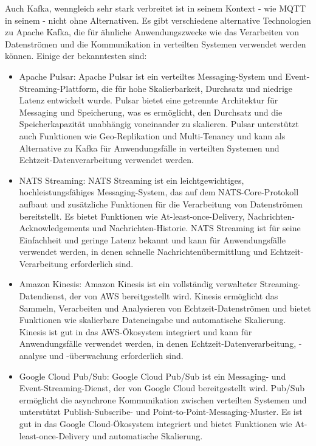 Auch Kafka, wenngleich sehr stark verbreitet ist in seinem Kontext - wie MQTT in seinem - nicht ohne Alternativen. Es gibt verschiedene alternative Technologien zu Apache Kafka, die für ähnliche Anwendungszwecke wie das Verarbeiten von Datenströmen und die Kommunikation in verteilten Systemen verwendet werden können. Einige der bekanntesten sind:
\begin{itemize}
\item Apache Pulsar: Apache Pulsar ist ein verteiltes Messaging-System und Event-Streaming-Plattform, die für hohe Skalierbarkeit, Durchsatz und niedrige Latenz entwickelt wurde. Pulsar bietet eine getrennte Architektur für Messaging und Speicherung, was es ermöglicht, den Durchsatz und die Speicherkapazität unabhängig voneinander zu skalieren. Pulsar unterstützt auch Funktionen wie Geo-Replikation und Multi-Tenancy und kann als Alternative zu Kafka für Anwendungsfälle in verteilten Systemen und Echtzeit-Datenverarbeitung verwendet werden.
\item NATS Streaming: NATS Streaming ist ein leichtgewichtiges, hochleistungsfähiges Messaging-System, das auf dem NATS-Core-Protokoll aufbaut und zusätzliche Funktionen für die Verarbeitung von Datenströmen bereitstellt. Es bietet Funktionen wie At-least-once-Delivery, Nachrichten-Acknowledgements und Nachrichten-Historie. NATS Streaming ist für seine Einfachheit und geringe Latenz bekannt und kann für Anwendungsfälle verwendet werden, in denen schnelle Nachrichtenübermittlung und Echtzeit-Verarbeitung erforderlich sind.
\item Amazon Kinesis: Amazon Kinesis ist ein vollständig verwalteter Streaming-Datendienst, der von AWS bereitgestellt wird. Kinesis ermöglicht das Sammeln, Verarbeiten und Analysieren von Echtzeit-Datenströmen und bietet Funktionen wie skalierbare Dateneingabe und automatische Skalierung. Kinesis ist gut in das AWS-Ökosystem integriert und kann für Anwendungsfälle verwendet werden, in denen Echtzeit-Datenverarbeitung, -analyse und -überwachung erforderlich sind.
\item Google Cloud Pub/Sub: Google Cloud Pub/Sub ist ein Messaging- und Event-Streaming-Dienst, der von Google Cloud bereitgestellt wird. Pub/Sub ermöglicht die asynchrone Kommunikation zwischen verteilten Systemen und unterstützt Publish-Subscribe- und Point-to-Point-Messaging-Muster. Es ist gut in das Google Cloud-Ökosystem integriert und bietet Funktionen wie At-least-once-Delivery und automatische Skalierung.
\end{itemize}


